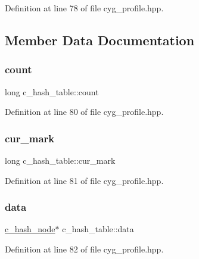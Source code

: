 Definition at line 78 of file cyg\+\_\+profile.\+hpp.



\subsection{Member Data Documentation}
\mbox{\label{structc__hash__table_ae4c33f323d44301e5990ba3355a2d708}} 
\subsubsection{\texorpdfstring{count}{count}}
{\footnotesize\ttfamily long c\+\_\+hash\+\_\+table\+::count}



Definition at line 80 of file cyg\+\_\+profile.\+hpp.

\mbox{\label{structc__hash__table_a87debaad1679b5fd28537908174a7487}} 
\subsubsection{\texorpdfstring{cur\+\_\+mark}{cur\_mark}}
{\footnotesize\ttfamily long c\+\_\+hash\+\_\+table\+::cur\+\_\+mark}



Definition at line 81 of file cyg\+\_\+profile.\+hpp.

\mbox{\label{structc__hash__table_abfdd282e54441552086f78d30b959d60}} 
\subsubsection{\texorpdfstring{data}{data}}
{\footnotesize\ttfamily \hyperlink{structc__hash__node}{c\+\_\+hash\+\_\+node}$\ast$ c\+\_\+hash\+\_\+table\+::data}



Definition at line 82 of file cyg\+\_\+profile.\+hpp.


